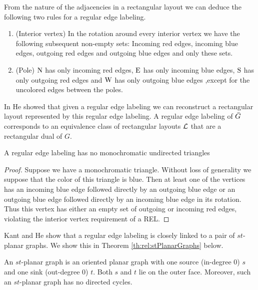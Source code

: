   From the nature of the adjacencies in a rectangular layout we can deduce the following two rules for a regular edge labeling.
  \begin{enumerate}
    \item (Interior vertex) In the rotation around every interior vertex we have the following subsequent non-empty sets: Incoming red edges, incoming blue edges, outgoing red edges and outgoing blue edges and only these sets.
    \item (Pole) $\mathrm{N}$ has only incoming red edges, $\mathrm{E}$ has only incoming blue edges, $\mathrm{S}$ has only outgoing red edges and $\mathrm{W}$ has only outgoing blue edges ,except for the uncolored edges between the poles.
  \end{enumerate}

  In \cite{He1993} He showed that given a regular edge labeling we can reconstruct a rectangular layout represented by this regular edge labeling.
  A regular edge labeling  of $\bar{G}$ corresponds to an equivalence class of rectangular layouts $\mathcal{L}$ that are a rectangular dual of $G$.

  \begin{lemma}
    \label{lm:rel:noMonoColoredTriangles}
    A regular edge labeling has no monochromatic undirected triangles
  \end{lemma}

  \begin{proof}
    Suppose we have a monochromatic triangle. Without loss of generality we suppose that the color of this triangle is blue. Then at least one of the vertices has an incoming blue edge followed directly by an outgoing blue edge or an outgoing blue edge followed directly by an incoming blue edge in its rotation. Thus this vertex has either an empty set of outgoing or incoming red edges, violating the interior vertex requirement of a REL.
  \end{proof}

    Kant and He \cite[pp.179]{Kant1997} show that a regular edge labeling is closely linked to a pair of $st$-planar graphs. We show this in Theorem \ref{th:rel:stPlanarGraphs} below.

    An $st$-planar graph is an oriented planar graph with one source (in-degree 0) $s$ and one sink (out-degree 0) $t$. Both $s$ and $t$ lie on the outer face. Moreover, such an $st$-planar graph has no directed cycles.


